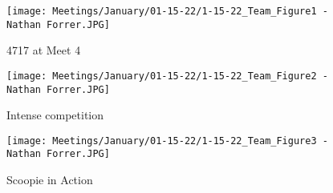  

\begin{figure}[ht]
\centering
\begin{minipage}[b]{.48\textwidth}
  \centering
  \texttt{[image: Meetings/January/01-15-22/1-15-22\_Team\_Figure1 - Nathan Forrer.JPG]}
  \caption{4717 at Meet 4}
  \label{fig:011522_1}
\end{minipage}%
\hfill%
\begin{minipage}[b]{.48\textwidth}
  \centering
  \texttt{[image: Meetings/January/01-15-22/1-15-22\_Team\_Figure2 - Nathan Forrer.JPG]}
  \caption{Intense competition}
  \label{fig:011522_2}
\end{minipage}
\end{figure}

\begin{figure}[htp]
\centering
\texttt{[image: Meetings/January/01-15-22/1-15-22\_Team\_Figure3 - Nathan Forrer.JPG]}
\caption{Scoopie in Action}
\label{fig:011522_3}
\end{figure}


